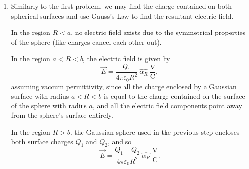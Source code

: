 \documentclass{article}
\begin{document}
\begin{enumerate}
	Since Coloumb's Law expresses field in terms of the radial distance from the source of charge, we may first find the magnitude of the difference vectors between the given point \(P\) and the two charges \(q_1\) and \(q_2\) as \begin{align*}
		&R_1 = \sqrt{-0.01^2+0.01^2} = 0.0141 \ \mathrm{m}, \\
		&R_2 = \sqrt{0.02^2 + (-0.04)^2} = 0.0447 \ \mathrm{m},
	\end{align*} 
	and their unit vectors as \begin{align*}
	 & \hat{\alpha_{R1}} = \frac{(-0.01, 0.01, 0)}{0.0141} = (-\frac{1}{\sqrt{2}}, \frac{1}{\sqrt{2}}, 0), \\
	 & \hat{\alpha_{R2}} = \frac{(0, 0.02, 0.04)}{0.0447} = (0, \frac{2}{\sqrt{20}}, -\frac{4}{\sqrt{20}}).
	\end{align*} 
	Then, multiplying magnitude and direction together, we may find the electric field vector induced by each point charge as \begin{align*}
		&\vec{E}_1 = \frac{6 \times 10^{-6}}{4 \pi (8.85 \times 10^{-12})(1.988 \times 10^{-4})} \ \hat{\alpha_{R1}}=(-1.919 \times 10^8, 1.919 \times 10^8, 0) \ \mathrm{\frac{V}{C}},  \\
		&\vec{E}_2 = \frac{q_2}{4 \pi (8.85 \times 10^{-12})(0.002)} \ \hat{\alpha_R} = (0, q_2 2.013 \times 10^{12}, q_2 4.03 \times 10^{12}) \ \mathrm{\frac{V}{C}}.
	\end{align*} 
	Then, focusing just on the y-components of the fields, \[
		q_2 2.013 \times 10^{12} - 1.919 \times 10^8 = 0 \Rightarrow q_2 = \frac{-1.919 \times 10^8}{2.013 \times 10^{12}} = -95.33 \micro\mathrm{C}. 
	\] 
	\item Similarly to the first problem, we may find the charge contained on both spherical surfaces and use Gauss's Law to find the resultant electric field. 
		
		In the region \(R<a\), no electric field exists due to the symmetrical properties of the sphere (like charges cancel each other out). 

		In the region \(a < R < b\), the electric field is given by \[
			\vec{E} = \frac{Q_1}{4\pi\varepsilon_0R^2} \ \hat{\alpha_R} \ \mathrm{\frac{V}{C}},
		\]
		assuming vaccum permittivity, since all the charge enclosed by a Gaussian surface with radius \(a < R < b\) is equal to the charge contained on the surface of the sphere with radius \(a\), and all the electric field components point away from the sphere's surface entirely. 

		In the region \(R > b\), the Gaussian sphere used in the previous step encloses both surface charges \(Q_1\) and \(Q_2\), and so \[
			\vec{E} = \frac{Q_1+Q_2}{4\pi\varepsilon_0R^2} \ \hat{\alpha_R} \ \mathrm{\frac{V}{C}}. 
		\]
\end{enumerate}
\end{document}
